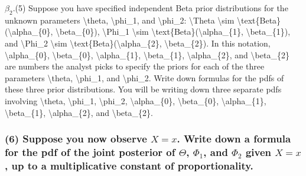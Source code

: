 \documentclass[]{article}
\begin{document}
{{{\(\beta_{2}\).}{(5) Suppose you have specified independent Beta prior distributions for the unknown parameters \textbackslash{}theta, \textbackslash{}phi\_1, and \textbackslash{}phi\_2: \textbackslash{}Theta \textbackslash{}sim \textbackslash{}text\{Beta\}(\textbackslash{}alpha\_\{0\}, \textbackslash{}beta\_\{0\}), \textbackslash{}Phi\_1 \textbackslash{}sim \textbackslash{}text\{Beta\}(\textbackslash{}alpha\_\{1\}, \textbackslash{}beta\_\{1\}), and \textbackslash{}Phi\_2 \textbackslash{}sim \textbackslash{}text\{Beta\}(\textbackslash{}alpha\_\{2\}, \textbackslash{}beta\_\{2\}). In this notation, \textbackslash{}alpha\_\{0\}, \textbackslash{}beta\_\{0\}, \textbackslash{}alpha\_\{1\}, \textbackslash{}beta\_\{1\}, \textbackslash{}alpha\_\{2\}, and \textbackslash{}beta\_\{2\} are numbers the analyst picks to specify the priors for each of the three parameters \textbackslash{}theta, \textbackslash{}phi\_1, and \textbackslash{}phi\_2. Write down formulas for the pdfs of these three prior distributions. You will be writing down three separate pdfs involving \textbackslash{}theta, \textbackslash{}phi\_1, \textbackslash{}phi\_2, \textbackslash{}alpha\_\{0\}, \textbackslash{}beta\_\{0\}, \textbackslash{}alpha\_\{1\}, \textbackslash{}beta\_\{1\}, \textbackslash{}alpha\_\{2\}, and \textbackslash{}beta\_\{2\}.}}\label{suppose-you-have-specified-independent-beta-prior-distributions-for-the-unknown-parameters-theta-phi_1-and-phi_2-theta-sim-textbetaalpha_0-beta_0-phi_1-sim-textbetaalpha_1-beta_1-and-phi_2-sim-textbetaalpha_2-beta_2.-in-this-notation-alpha_0-beta_0-alpha_1-beta_1-alpha_2-and-beta_2-are-numbers-the-analyst-picks-to-specify-the-priors-for-each-of-the-three-parameters-theta-phi_1-and-phi_2.-write-down-formulas-for-the-pdfs-of-these-three-prior-distributions.-you-will-be-writing-down-three-separate-pdfs-involving-theta-phi_1-phi_2-alpha_0-beta_0-alpha_1-beta_1-alpha_2-and-beta_2.}}

\hypertarget{suppose-you-now-observe-x-x.-write-down-a-formula-for-the-pdf-of-the-joint-posterior-of-theta-phi_1-and-phi_2-given-x-x-up-to-a-multiplicative-constant-of-proportionality.}{%
\subsubsection{\texorpdfstring{(6) Suppose you now observe \(X = x\).
Write down a formula for the pdf of the joint posterior of \(\Theta\),
\(\Phi_1\), and \(\Phi_2\) given \(X = x\), up to a multiplicative
constant of
proportionality.}{(6) Suppose you now observe X = x. Write down a formula for the pdf of the joint posterior of \textbackslash{}Theta, \textbackslash{}Phi\_1, and \textbackslash{}Phi\_2 given X = x, up to a multiplicative constant of proportionality.}}\label{suppose-you-now-observe-x-x.-write-down-a-formula-for-the-pdf-of-the-joint-posterior-of-theta-phi_1-and-phi_2-given-x-x-up-to-a-multiplicative-constant-of-proportionality.}}
\end{document}

